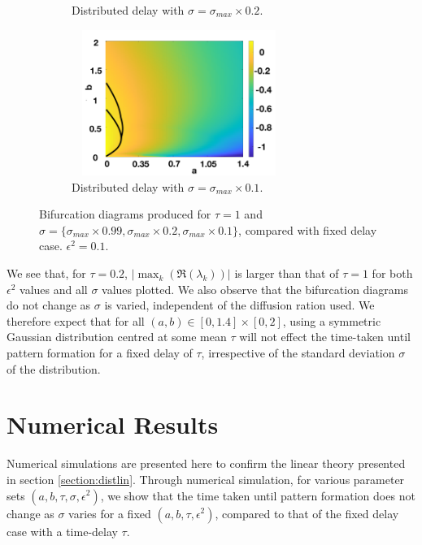 \begin{figure}[H]
\begin{subfigure}[b]{0.45\textwidth}
        \caption{Distributed delay with $\sigma=\sigma_{max}\times0.2$.}
        \label{}
    \end{subfigure}
    \hfill
    \begin{subfigure}[b]{0.45\textwidth}
        \centering
        \includegraphics[width=7cm,height=4.75cm]{distbif44.png}
        \caption{Distributed delay with $\sigma=\sigma_{max}\times0.1$.}
        \label{}
    \end{subfigure}
    \caption{Bifurcation diagrams produced for $\tau=1$ and $\sigma=\{ \sigma_{max}\times0.99,\sigma_{max}\times0.2,\sigma_{max}\times0.1 \}$, compared with fixed delay case. $\epsilon^2=0.1$.}
    \label{fig:distbif4}
\end{figure}

We see that, for $\tau=0.2$, $|\max_k(\Re(\lambda_k))|$ is larger than that of $\tau=1$ for both $\epsilon^2$ values and all $\sigma$ values plotted. We also observe that the bifurcation diagrams do not change as $\sigma$ is varied, independent of the diffusion ration used. We therefore expect that for all $(a,b)\in[0,1.4]\times[0,2]$, using a symmetric Gaussian distribution centred at some mean $\tau$ will not effect the time-taken until pattern formation for a fixed delay of $\tau$, irrespective of the standard deviation $\sigma$ of the distribution.


\section{Numerical Results}\label{section:distsim}
Numerical simulations are presented here to confirm the linear theory presented in section \ref{section:distlin}. Through numerical simulation, for various parameter sets $(a,b,\tau,\sigma,\epsilon^2)$, we show that the time taken until pattern formation does not change as $\sigma$ varies for a fixed $(a,b,\tau,\epsilon^2)$, compared to that of the fixed delay case with a time-delay $\tau$.
